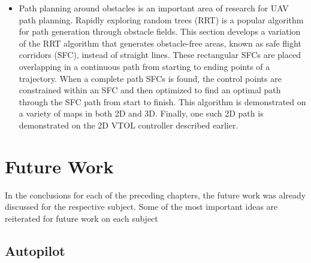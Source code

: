 \begin{itemize}
      They are extremely useful due to their simplicity, their simple differentiation, and their ability to be parameterized by control points.
      Uniform B-Splines are trajectories created by B-Splines that have no modification to any of the basis functions, including the initial and final points.
      The ability to efficiently generate and update B-Splines trajectories in real time is crucial for many robotic applications.
      B-Splines and their control points can be represented in matrix form, which provides a compact notation that is easily stored and manipulated by a computer.
      This section develops the matrix math necessary to store sampled B-Splines segments in look-up tables for rapid access.
      A library is developed with these look-up tables and minimum-snap trajectories may then be easily generated in real time.
    \item Path planning around obstacles is an important area of research for UAV path planning.
      Rapidly exploring random trees (RRT) is a popular algorithm for path generation through obstacle fields.
      This section develops a variation of the RRT algorithm that generates obstacle-free areas, known as safe flight corridors (SFC), instead of straight lines.
      These rectangular SFCs are placed overlapping in a continuous path from starting to ending points of a trajectory.
      When a complete path SFCs is found, the control points are constrained within an SFC and then optimized to find an optimal path through the SFC path from start to finish.
      This algorithm is demonstrated on a variety of maps in both 2D and 3D.
      Finally, one such 2D path is demonstrated on the 2D VTOL controller described earlier.
\end{itemize}


\section{Future Work}

In the conclusions for each of the preceding chapters, the future work was already discussed for the respective subject.
Some of the most important ideas are reiterated for future work on each subject

\subsection{Autopilot}

